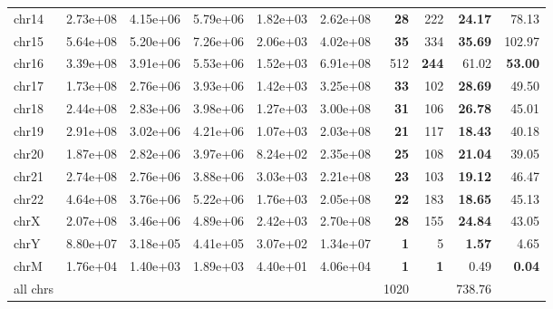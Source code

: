 \begin{table*}[!ht]
\begin{tabular}{@{}lrrrrrrrrr@{}}
		chr14 & 2.73e+08 & 4.15e+06 & 5.79e+06 & 1.82e+03 & 2.62e+08 & \textbf{28} & 222 & \textbf{24.17} & 78.13 \\ 
		chr15 & 5.64e+08 & 5.20e+06 & 7.26e+06 & 2.06e+03 & 4.02e+08 & \textbf{35} & 334 & \textbf{35.69} & 102.97 \\ 
		chr16 & 3.39e+08 & 3.91e+06 & 5.53e+06 & 1.52e+03 & 6.91e+08 & 512 & \textbf{244} & 61.02 & \textbf{53.00} \\ 
		chr17 & 1.73e+08 & 2.76e+06 & 3.93e+06 & 1.42e+03 & 3.25e+08 & \textbf{33} & 102 & \textbf{28.69} & 49.50 \\ 
		chr18 & 2.44e+08 & 2.83e+06 & 3.98e+06 & 1.27e+03 & 3.00e+08 & \textbf{31} & 106 & \textbf{26.78} & 45.01 \\ 
		chr19 & 2.91e+08 & 3.02e+06 & 4.21e+06 & 1.07e+03 & 2.03e+08 & \textbf{21} & 117 & \textbf{18.43} & 40.18 \\ 
		chr20 & 1.87e+08 & 2.82e+06 & 3.97e+06 & 8.24e+02 & 2.35e+08 & \textbf{25} & 108 & \textbf{21.04} & 39.05 \\ 
		chr21 & 2.74e+08 & 2.76e+06 & 3.88e+06 & 3.03e+03 & 2.21e+08 & \textbf{23} & 103 & \textbf{19.12} & 46.47 \\ 
		chr22 & 4.64e+08 & 3.76e+06 & 5.22e+06 & 1.76e+03 & 2.05e+08 & \textbf{22} & 183 & \textbf{18.65} & 45.13 \\ 
		chrX & 2.07e+08 & 3.46e+06 & 4.89e+06 & 2.42e+03 & 2.70e+08 & \textbf{28} & 155 & \textbf{24.84} & 43.05 \\ 
		chrY & 8.80e+07 & 3.18e+05 & 4.41e+05 & 3.07e+02 & 1.34e+07 & \textbf{1} & 5 & \textbf{1.57} & 4.65 \\ 
		chrM & 1.76e+04 & 1.40e+03 & 1.89e+03 & 4.40e+01 & 4.06e+04 & \textbf{1} & \textbf{1} & 0.49 & \textbf{0.04}  \\ 
		all chrs & & & & &  & 1020 &  & 738.76 & \\
		\bottomrule
	\end{tabular}
\end{table*}
